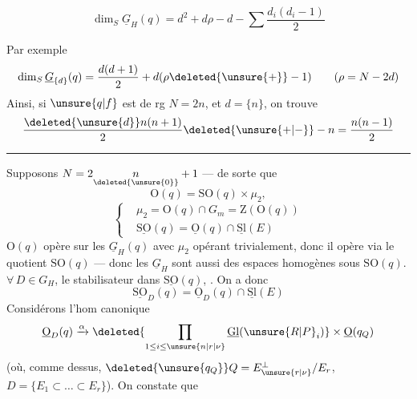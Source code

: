 \[
\dim_S\underline G_H(q)=d^2+d\rho-d-\sum\frac{d_i(d_i-1)}2
\]

Par exemple
\[
\dim_S\underline G_{\{d\}}(q)=\frac{d(d+1)}{2}+d(\rho\deleted{\unsure{+}}-1)\qquad(\rho=N-2d)
\]
Ainsi, si $\unsure{q|f}$ est de rg $N=2n$, et $d=\{n\}$,  on trouve
\[
\frac{\deleted{\unsure{d}}n(n+1)}{2}\deleted{\unsure{+|-}}-n=\frac{n(n-1)}{2}
\]

\begin{center}\rule{.14\linewidth}{.4pt}\end{center}

Supposons $N=2\underset{\deleted{\unsure{0}}}{n}+1$ --- de sorte que
\[
\mathrm O(q)=\mathrm{SO}(q)\times\mu_2,
\]
 
\[
\left\{\begin{aligned}
&\mu_2=\mathrm O(q)\cap G_m=\mathrm Z(\mathrm O(q))\\
&\underline{\mathrm{SO}}(q)=\underline{\mathrm O}(q)\cap\underline{\mathrm{Sl}}(E)
\end{aligned}\right.
\]
  $\mathrm O(q)$ opère sur les $\underline G_H(q)$ avec $\mu_2$ opérant trivialement, donc il opère via le quotient $\mathrm{SO}(q)$ --- donc les $\underline G_H$ sont aussi des espaces homogènes sous $\mathrm{SO}(q)$.    $\forall\,D\in G_H$,  le stabilisateur dans $\underline{\mathrm{SO}}(q)$, . On a donc
\[
\underline{\mathrm{SO}}_D(q)=\underline{\mathrm O}_D(q)\cap\underline{\mathrm{Sl}}(E)
\]
Considérons l'hom canonique
\[
\underline{\mathrm O}_D(q)\xrightarrow{\alpha}\deleted{\prod_{1\leq i\leq\unsure{n|r|\nu}}\underline{\mathrm{Gl}}(\unsure{R|P}_i)}\times\underline{\mathrm O}(q_Q)
\]
(où, comme dessus, $\deleted{\unsure{q_Q}}Q=E_{\unsure{r|\nu}}^\perp/E_r$, $D=\{E_1\subset\ldots\subset E_r\}$). On constate que
